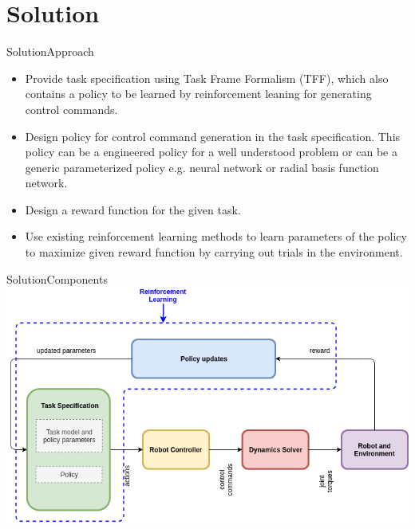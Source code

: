\documentclass[aspectratio=43,10pt,fleqn,t]{beamer}
\begin{document}
\section{Solution}
\begin{frame}{Solution}{\small Approach}
	\begin{itemize}
		\small
	\item Provide task specification using Task Frame Formalism (TFF), which also contains a policy to be learned by reinforcement leaning for generating control commands.

	\item Design policy for control command generation in the task specification. This policy can be a engineered policy for a well understood problem or can be a generic parameterized policy e.g. neural network or radial basis function network.

	\item Design a reward function for the given task.

	\item Use existing reinforcement learning methods to learn parameters of the policy to maximize given reward function by carrying out trials in the environment.
	\end{itemize}
\end{frame}
\begin{frame}{Solution}{\small Components}
	\includegraphics[width=\textwidth]{images/composition}
\end{frame}
\end{document}
